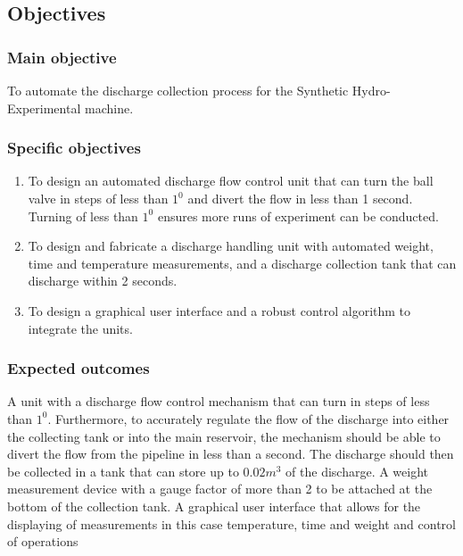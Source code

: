 \subsection{Objectives}
\subsubsection{Main objective}

 To automate the discharge collection process for the Synthetic Hydro-Experimental machine. 

\subsubsection{Specific objectives}

\begin{enumerate}
	\item To design an automated discharge flow control unit that can turn the ball valve in steps of less than $1^{0}$ and divert the flow in less than 1 second. Turning of less than $1^{0}$ ensures more runs of experiment can be conducted.
	\item To design and fabricate a discharge handling unit with automated weight, time and temperature measurements, and a discharge collection tank that can discharge within 2 seconds.
    \item To design a graphical user interface and a robust control algorithm to integrate the units.

\end{enumerate}

\subsubsection{Expected outcomes}
A unit with a discharge flow control mechanism that can turn in steps of less than $1^{0}$. Furthermore, to accurately regulate the flow of the discharge into either the collecting tank or into the main reservoir, the mechanism should be able to divert the flow from the pipeline in less than a second. The discharge should then be collected in a  tank that can store up to $0.02m^{3}$ of the discharge. A weight measurement device with a gauge factor of more than 2 to be attached at the bottom of the collection tank. A graphical user interface that allows for the displaying of measurements in this case temperature, time and weight and control of operations

